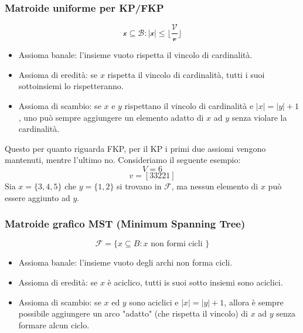 \documentclass{article}
\begin{document}
\subsubsection{Matroide uniforme per KP/FKP}
$$\mathcal{x\subseteq B:|x|\leq\lfloor\frac{V}{v}\rfloor}$$
\begin{itemize}
    \item Assioma banale: l'insieme vuoto rispetta il vincolo di cardinalità.
    \item Assioma di eredità: se $x$ rispetta il vincolo di cardinalità, tutti
          i suoi sottoinsiemi lo rispetteranno.
    \item Assioma di scambio: se $x$ e $y$ rispettano il vincolo di cardinalità e
          $|x|=|y|+1$, uno può sempre aggiungere un elemento adatto di $x$ ad $y$ senza violare
          la cardinalità.
\end{itemize}
Questo per quanto riguarda FKP, per il KP i primi due assiomi vengono mantenuti, mentre l'ultimo
no.
Consideriamo il seguente esempio:
$$V=6$$
$$v=[3 3 2 2 1]$$
Sia $x=\{3,4,5\}$ che $y=\{1,2\}$ si trovano in $\mathcal{F}$, ma nessun elemento di $x$ può
essere aggiunto ad $y$.

\subsubsection{Matroide grafico MST (Minimum Spanning Tree)}
$$\mathcal{F}=\{x\subseteq B:x\text{ non formi cicli }\}$$
\begin{itemize}
    \item Assioma banale: l'insieme vuoto degli archi non forma cicli.
    \item Assioma di eredità: se $x$ è aciclico, tutti is suoi sotto insiemi sono aciclici.
    \item Assioma di scambio: se $x$ ed $y$ sono aciclici e $|x|= |y|+1$, allora è sempre
          possibile aggiungere un arco "adatto" (che rispetta il vincolo) di $x$ ad $y$ senza
          formare alcun ciclo.
\end{itemize}
\end{document}
